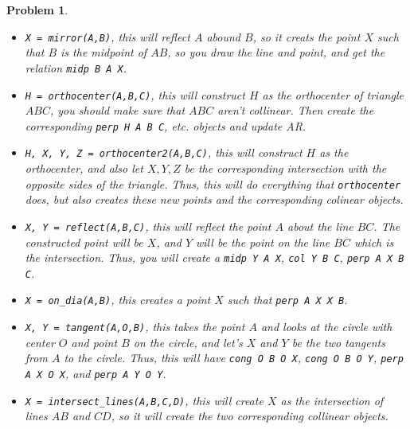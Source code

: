 \documentclass{article}
\newtheorem{problem}{Problem}
\begin{document}
\begin{problem}
\begin{itemize}
    \item \verb|X = mirror(A,B)|, this will reflect $A$ abound $B$, so it creats the point $X$ such that $B$ is the midpoint of $AB$, so you draw the line and point, and get the relation \verb|midp B A X|. 

    \item \verb|H = orthocenter(A,B,C)|, this will construct $H$ as the orthocenter of triangle $ABC$, you should make sure that $ABC$ aren't collinear. Then create the corresponding \verb|perp H A B C|, etc. objects and update AR.

    \item \verb|H, X, Y, Z = orthocenter2(A,B,C)|, this will construct $H$ as the orthocenter, and also let $X,Y,Z$ be the corresponding intersection with the opposite sides of the triangle. Thus, this will do everything that \verb|orthocenter| does, but also creates these new points and the corresponding colinear objects. 

    \item \verb|X, Y = reflect(A,B,C)|, this will reflect the point $A$ about the line $BC$. The constructed point will be $X$, and $Y$ will be the point on the line $BC$ which is the intersection. Thus, you will create a \verb|midp Y A X|, \verb|col Y B C|, \verb|perp A X B C|.

    \item \verb|X = on_dia(A,B)|, this creates a point $X$ such that \verb|perp A X X B|. 

    \item \verb|X, Y = tangent(A,O,B)|, this takes the point $A$ and looks at the circle with center $O$ and point $B$ on the circle, and let's $X$ and $Y$ be the two tangents from $A$ to the circle. Thus, this will have \verb|cong O B O X|, \verb|cong O B O Y|, \verb|perp A X O X|, and \verb|perp A Y O Y|. 

    \item \verb|X = intersect_lines(A,B,C,D)|, this will create $X$ as the intersection of lines $AB$ and $CD$, so it will create the two corresponding collinear objects.     
\end{itemize}

\end{problem}
\end{document}
